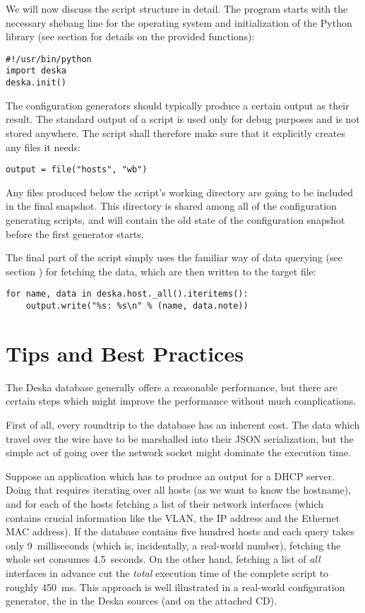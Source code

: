 \documentclass[deska]{subfiles}
\begin{document}
We will now discuss the script structure in detail.  The program starts with the necessary shebang line for the
operating system and initialization of the Python library (see section  for details on the
provided functions):

\begin{verbatim}
#!/usr/bin/python
import deska
deska.init()
\end{verbatim}

The configuration generators should typically produce a certain output as their result.  The standard output of a script
is used only for debug purposes and is not stored anywhere.  The script shall therefore make sure that it explicitly
creates any files it needs:

\begin{verbatim}
output = file("hosts", "wb")
\end{verbatim}

Any files produced below the script's working directory are going to be included in the final snapshot.  This directory
is shared among all of the configuration generating scripts, and will contain the old state of the configuration
snapshot before the first generator starts.

The final part of the script simply uses the familiar way of data querying (see section )
for fetching the data, which are then written to the target file:

\begin{verbatim}
for name, data in deska.host._all().iteritems():
    output.write("%s: %s\n" % (name, data.note))
\end{verbatim}

\section{Tips and Best Practices}

The Deska database generally offers a reasonable performance, but there are certain steps which might improve the
performance without much complications.

First of all, every roundtrip to the database has an inherent cost.  The data which travel over the wire have to be
marshalled into their JSON serialization, but the simple act of going over the network socket might dominate the
execution time.

Suppose an application which has to produce an output for a DHCP server.  Doing that requires iterating over all hosts
(as we want to know the hostname), and for each of the hosts fetching a list of their network interfaces (which contains
crucial information like the VLAN, the IP address and the Ethernet MAC address).  If the database contains five hundred
hosts and each query takes only 9~milliseconds (which is, incidentally, a real-world number), fetching the whole set
consumes 4.5~seconds.  On the other hand, fetching a list of {\em all} interfaces in advance cut the {\em total}
execution time of the complete script to roughly 450~ms.  This approach is well illustrated in a real-world
configuration generator, the  in the Deska sources (and on the attached CD).
\end{document}
